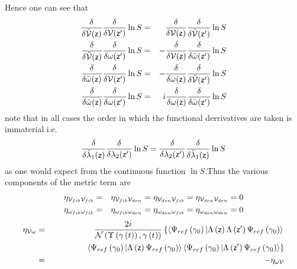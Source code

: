 Hence one can see that 
\begin{eqnarray}
\frac{\delta }{\delta {\cal \tilde{V}}({\sf z})}\frac{\delta }{\delta {\cal V%
}({\sf z}^{\prime })}\ln S &=&\frac{\delta }{\delta {\cal V}({\sf z})}\frac{%
\delta }{\delta {\cal \tilde{V}}({\sf z}^{\prime })}\ln S \\
\frac{\delta }{\delta {\cal \tilde{V}}({\sf z})}\frac{\delta }{\delta {\cal %
\omega }({\sf z}^{\prime })}\ln S &=&-\frac{\delta }{\delta {\cal V}({\sf z})%
}\frac{\delta }{\delta {\cal \tilde{\omega}}({\sf z}^{\prime })}\ln S \\
\frac{\delta }{\delta {\cal \tilde{\omega}}({\sf z})}\frac{\delta }{\delta 
{\cal V}({\sf z}^{\prime })}\ln S &=&-\frac{\delta }{\delta \omega ({\sf z})}%
\frac{\delta }{\delta {\cal \tilde{V}}({\sf z}^{\prime })}\ln S \\
\frac{\delta }{\delta {\cal \tilde{\omega}}({\sf z})}\frac{\delta }{\delta
\omega ({\sf z}^{\prime })}\ln S &=&i\frac{\delta }{\delta \omega ({\sf z})}%
\frac{\delta }{\delta {\cal \tilde{\omega}}({\sf z}^{\prime })}\ln S
\end{eqnarray}%
note that in all cases the order in which the functional derrivatives are
taken is immaterial i.e.%
\begin{equation}
\frac{\delta }{\delta \tilde{\lambda}_{1}({\sf z})}\frac{\delta }{\delta
\lambda _{2}({\sf z}^{\prime })}\ln S=\frac{\delta }{\delta \lambda _{2}(%
{\sf z}^{\prime })}\frac{\delta }{\delta \tilde{\lambda}_{1}({\sf z})}\ln S
\end{equation}%
as one would expect from the continuous function $\ln S.$Thus the various
components of the metric term are 
\begin{eqnarray}
\eta _{{\cal V}_{fib}{\cal V}_{fib}} &=&\eta _{{\cal V}_{fib}{\cal V}%
_{den}}=\eta _{{\cal V}_{den}{\cal V}_{fib}}=\eta _{{\cal V}_{den}{\cal V}%
_{den}}=0 \\
\eta _{{\cal \omega }_{fib}{\cal \omega }_{fib}} &=&\eta _{{\cal \omega }%
_{fib}{\cal \omega }_{den}}=\eta _{{\cal \omega }_{den}{\cal \omega }%
_{fib}}=\eta _{{\cal \omega }_{den}{\cal \omega }_{den}}=0
\end{eqnarray}%
\begin{eqnarray}
\eta _{{\cal V\omega }} &=&\frac{2i}{{\cal N}\left( \Upsilon \left( \gamma
\left( t\right) \right) ,\gamma \left( t\right) \right) }\left\{
\left\langle \Psi _{ref}\left( \gamma _{0}\right) |\Lambda \left( {\sf z}%
\right) \Lambda \left( {\sf z}^{\prime }\right) \Psi _{ref}\left( \gamma
_{0}\right) \right\rangle \right.  \nonumber \\
&&\qquad \qquad \left. \left\langle \Psi _{ref}\left( \gamma _{0}\right)
|\Lambda \left( {\sf z}\right) \Psi _{ref}\left( \gamma _{0}\right)
\right\rangle \left\langle \Psi _{ref}\left( \gamma _{0}\right) |\Lambda
\left( {\sf z}^{\prime }\right) \Psi _{ref}\left( \gamma _{0}\right)
\right\rangle \right\}  \nonumber \\
&=&-\eta _{\omega {\cal V}}  \label{vomega}
\end{eqnarray}%
